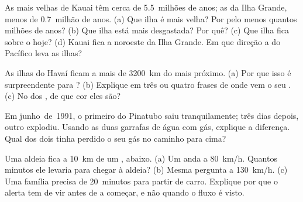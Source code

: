 \begin{exercise}[$\star\star$]\label{exo:g7:volcanoes:8}
As  mais velhas de Kauai têm cerca de 5.5~milhões de anos; as da
Ilha Grande, menos de 0.7~milhão de anos. (a) Que ilha é mais velha? Por
pelo menos quantos milhões de anos? (b) Que ilha está mais desgastada? Por
quê? (c) Que ilha fica sobre o  hoje? (d) Kauai fica a
noroeste da Ilha Grande. Em que direção a  do Pacífico leva as ilhas?
\end{exercise}

\begin{exercise}[$\star\star$]\label{exo:g7:volcanoes:9}
As ilhas do Havaí ficam a mais de \qty{3200}{km} do  mais
próximo. (a) Por que isso é surpreendente para ? (b) Explique em
três ou quatro frases de onde vem o seu . (c) No  dos , de
que cor eles são?
\end{exercise}

\begin{exercise}[$\star\star$]\label{exo:g7:volcanoes:10}
Em junho~de~1991, o primeiro  do Pinatubo saiu tranquilamente; três
dias depois, outro  explodiu. Usando as duas garrafas de água com
gás, explique a diferença. Qual dos dois  tinha perdido o seu gás no
caminho para cima?
\end{exercise}

\begin{exercise}[$\star\star\star$]\label{exo:g7:volcanoes:11}
Uma aldeia fica a \qty{10}{km} de um ,  abaixo. (a) Um  anda a \qty{80}{km/h}. Quantos minutos ele levaria para chegar
à aldeia? (b) Mesma pergunta a \qty{130}{km/h}. (c) Uma família precisa de
20~minutos para partir de carro. Explique por que o alerta tem de vir antes
de a  começar, e não quando o fluxo é visto.
\end{exercise}

